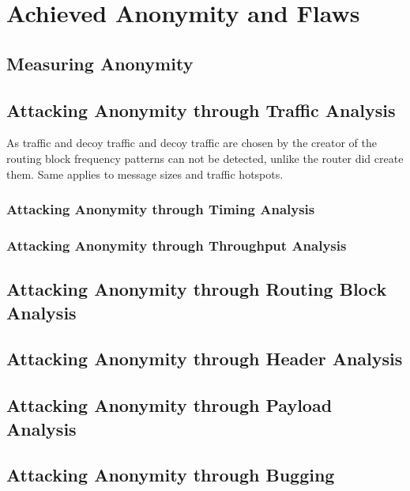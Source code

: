 \section{Achieved Anonymity and Flaws}
\subsection{Measuring Anonymity}

\subsection{Attacking Anonymity through Traffic Analysis}
As traffic and decoy traffic and decoy traffic are chosen by the creator of the routing block frequency patterns can not be detected, unlike the router did create them. Same applies to message sizes and traffic hotspots. 

\subsubsection{Attacking Anonymity through Timing Analysis}

\subsubsection{Attacking Anonymity through Throughput Analysis}

\subsection{Attacking Anonymity through Routing Block Analysis}

\subsection{Attacking Anonymity through Header Analysis}

\subsection{Attacking Anonymity through Payload Analysis}

\subsection{Attacking Anonymity through Bugging}


